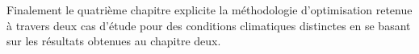 Finalement le quatrième chapitre explicite la méthodologie d’optimisation retenue
à travers deux cas d’étude pour des conditions climatiques distinctes en se basant
sur les résultats obtenues au chapitre deux.

\begin{figure}
    \centering
    \label{fig:plan_schématique}
\end{figure}




























